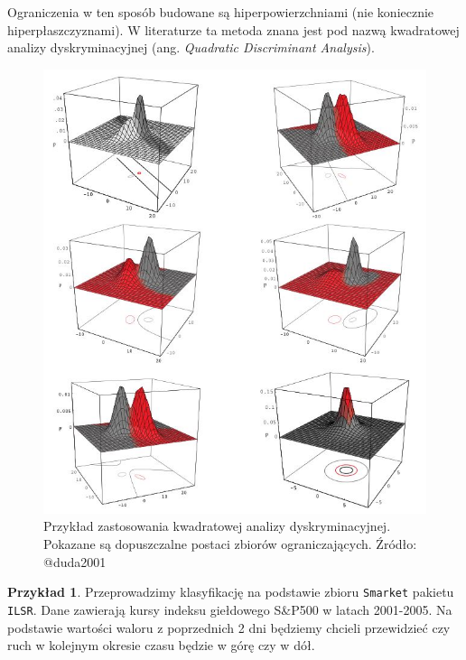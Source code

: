 \documentclass[
]{book}
\theoremstyle{plain}
\theoremstyle{definition}
\theoremstyle{definition}
\theoremstyle{definition}
\newtheorem{example}{Przykład}[chapter]
\theoremstyle{definition}
\theoremstyle{definition}
\theoremstyle{remark}
\begin{document}
Ograniczenia w ten sposób budowane są hiperpowierzchniami (nie koniecznie hiperpłaszczyznami). W literaturze ta metoda znana jest pod nazwą kwadratowej analizy dyskryminacyjnej (ang. \emph{Quadratic Discriminant Analysis}).

\begin{figure}

{\centering \includegraphics[width=6.35in]{images/dyskrym3} 

}

\caption{Przykład zastosowania kwadratowej analizy dyskryminacyjnej. Pokazane są dopuszczalne postaci zbiorów ograniczających. Źródło: @duda2001}\label{fig:hiper3}
\end{figure}

\begin{example}
\protect\hypertarget{exm:caravan}{}\label{exm:caravan}Przeprowadzimy klasyfikację na podstawie zbioru \texttt{Smarket} pakietu \texttt{ILSR}. Dane zawierają kursy indeksu giełdowego S\&P500 w latach 2001-2005. Na podstawie wartości waloru z poprzednich 2 dni będziemy chcieli przewidzieć czy ruch w kolejnym okresie czasu będzie w górę czy w dół.
\end{example}
\end{document}
